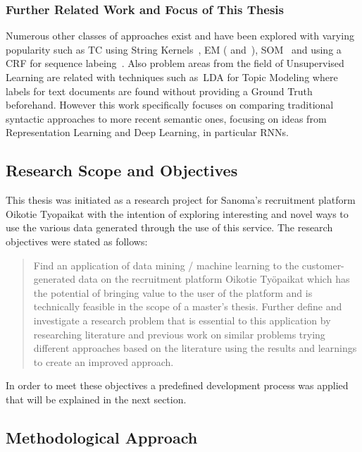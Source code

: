 \subsubsection*{Further Related Work and Focus of This Thesis}
\label{subs:Further Related Work and Focus of This Thesis}

Numerous other classes of approaches exist and have been explored with varying popularity such as \gls{TC} using String Kernels~\cite{Lodhi:2002aa}, \gls{EM} (\cite{Nigam:2000aa} and~\cite{McCallum:1999aa}), \gls{SOM}~\cite{Merkl:1998aa} and using a \gls{CRF} for sequence labeing~\cite{Lafferty:2001aa}.
Also problem areas from the field of \gls{Unsupervised Learning} are related with techniques such as~\gls{LDA} \cite{Blei:2003aa} for \gls{Topic Modeling} where labels for text documents are found without providing a \gls{Ground Truth} beforehand. However this work specifically focuses on comparing traditional syntactic approaches to more recent semantic ones, focusing on ideas from \gls{Representation Learning} and \gls{Deep Learning}, in particular \glspl{RNN}.

\subsection{Research Scope and Objectives}
\label{sub:Research Scope and Objectives}

This thesis was initiated as a research project for Sanoma's recruitment platform \gls{Oikotie Tyopaikat} with the intention of exploring interesting and novel ways to use the various data generated through the use of this service. The research objectives were stated as follows:

\blockquote{Find an application of data mining / machine learning to the customer-generated data on the recruitment platform Oikotie Työpaikat which has the potential of bringing value to the user of the platform and is technically feasible in the scope of a master’s thesis. Further define and investigate a research problem that is essential to this application by researching literature and previous work on similar problems trying different approaches based on the literature using the results and learnings to create an improved approach.}

In order to meet these objectives a predefined development process was applied that will be explained in the next section.

\subsection{Methodological Approach}
\label{sub:Methodological Approach}


